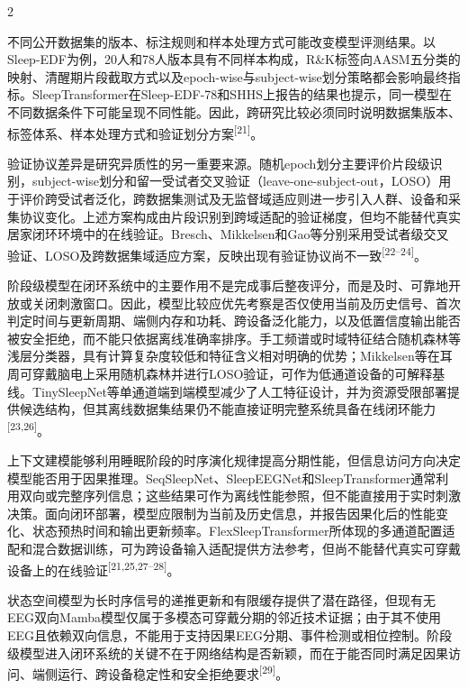 \documentclass[UTF8,zihao=5,fontset=none]{ctexart}
\newcommand{\song}{\CJKfamily{song}}
\newcommand{\levelthree}[1]{%
  \par\noindent{\song\fontsize{10.5pt}{12.6pt}\selectfont #1}}
\newcommand{\refcite}[1]{\nolinebreak[4]\textsuperscript{[#1]}}
\begin{document}
\begin{multicols}{2}

不同公开数据集的版本、标注规则和样本处理方式可能改变模型评测结果。以Sleep-EDF为例，20人和78人版本具有不同样本构成，R\&K标签向AASM五分类的映射、清醒期片段截取方式以及epoch-wise与subject-wise划分策略都会影响最终指标。SleepTransformer在Sleep-EDF-78和SHHS上报告的结果也提示，同一模型在不同数据条件下可能呈现不同性能。因此，跨研究比较必须同时说明数据集版本、标签体系、样本处理方式和验证划分方案\refcite{21}。\par

验证协议差异是研究异质性的另一重要来源。随机epoch划分主要评价片段级识别，subject-wise划分和留一受试者交叉验证（leave-one-subject-out，LOSO）用于评价跨受试者泛化，跨数据集测试及无监督域适应则进一步引入人群、设备和采集协议变化。上述方案构成由片段识别到跨域适配的验证梯度，但均不能替代真实居家闭环环境中的在线验证。Bresch、Mikkelsen和Gao等分别采用受试者级交叉验证、LOSO及跨数据集域适应方案，反映出现有验证协议尚不一致\refcite{22--24}。\par

\levelthree{2.2.3 阶段级表征与上下文模型}
阶段级模型在闭环系统中的主要作用不是完成事后整夜评分，而是及时、可靠地开放或关闭刺激窗口。因此，模型比较应优先考察是否仅使用当前及历史信号、首次判定时间与更新周期、端侧内存和功耗、跨设备泛化能力，以及低置信度输出能否被安全拒绝，而不能只依据离线准确率排序。手工频谱或时域特征结合随机森林等浅层分类器，具有计算复杂度较低和特征含义相对明确的优势；Mikkelsen等在耳周可穿戴脑电上采用随机森林并进行LOSO验证，可作为低通道设备的可解释基线。TinySleepNet等单通道端到端模型减少了人工特征设计，并为资源受限部署提供候选结构，但其离线数据集结果仍不能直接证明完整系统具备在线闭环能力\refcite{23,26}。\par

上下文建模能够利用睡眠阶段的时序演化规律提高分期性能，但信息访问方向决定模型能否用于因果推理。SeqSleepNet、SleepEEGNet和SleepTransformer通常利用双向或完整序列信息；这些结果可作为离线性能参照，但不能直接用于实时刺激决策。面向闭环部署，模型应限制为当前及历史信息，并报告因果化后的性能变化、状态预热时间和输出更新频率。FlexSleepTransformer所体现的多通道配置适配和混合数据训练，可为跨设备输入适配提供方法参考，但尚不能替代真实可穿戴设备上的在线验证\refcite{21,25,27--28}。\par

状态空间模型为长时序信号的递推更新和有限缓存提供了潜在路径，但现有无EEG双向Mamba模型仅属于多模态可穿戴分期的邻近技术证据；由于其不使用EEG且依赖双向信息，不能用于支持因果EEG分期、事件检测或相位控制。阶段级模型进入闭环系统的关键不在于网络结构是否新颖，而在于能否同时满足因果访问、端侧运行、跨设备稳定性和安全拒绝要求\refcite{29}。\par


\end{multicols}
\end{document}
